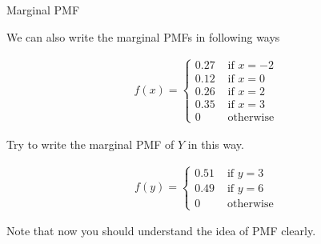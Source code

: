 \documentclass[8pt, usepdftitle = false]{beamer}
\begin{document}
\begin{frame}{Marginal PMF}


We can also write the marginal PMFs in following ways

\begin{align*}
  f(x)= \begin{cases} 0.27 & \text { if } x=-2 \\ 
  0.12 & \text { if } x=0 \\ 
  0.26 & \text { if } x=2 \\ 
  0.35 & \text { if } x=3 \\ 
  0 & \text { otherwise }\end{cases}
\end{align*}

Try to write the marginal PMF of $Y$ in this way. 

\begin{align*}
  f(y)= \begin{cases} 0.51 & \text { if } y=3 \\ 
  0.49 & \text { if } y=6 \\ 
  0 & \text { otherwise }\end{cases}
\end{align*}

Note that now you should understand the idea of PMF clearly.


\end{frame}
\end{document}
